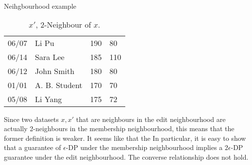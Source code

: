 \begin{frame}
\begin{exampleblock}{Neihgbourhood example}
{\begin{table}[H]
\begin{tabular}{l|l|l|l}
          \hline
          06/07 & Li Pu & 190 & 80 \\
          06/14 & Sara Lee & 185 & 110  \\
          06/12 & John Smith & \alert{180} & \alert{80} \\
          01/01 & A. B. Student & 170 & 70 \\
          05/08 & Li Yang & 175 & 72 
        \end{tabular}
        \caption{$x'$, 2-Neighbour of $x$.}
        \label{tab:data-x-edit}
      \end{table}
    }
  \end{exampleblock}

\end{frame}
Since two datasets $x, x'$ that are neighbours in the edit neighbourhood are actually 2-neighbours in the membership neighbourhood, this means that the former definition is weaker. It seems like that the 
In particular, it is easy to show that a guarantee of $\epsilon$-DP under the membership neighbourhood implies a $2 \epsilon$-DP guarantee under the edit neighbourhood.  The converse relationship does not hold. 
